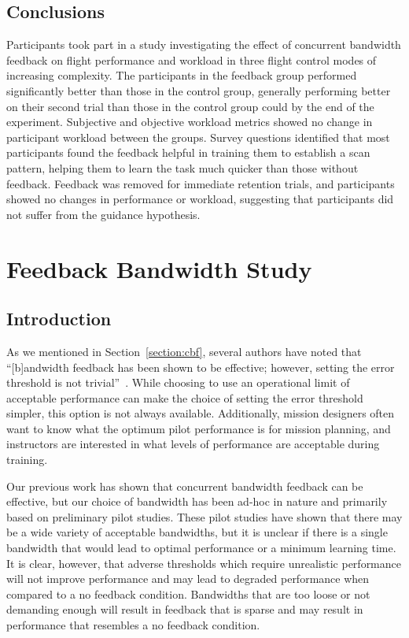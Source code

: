 \section{Conclusions}
Participants took part in a study investigating the effect of concurrent bandwidth feedback on flight performance and workload in three flight control modes of increasing complexity.
The participants in the feedback group performed significantly better than those in the control group, generally performing better on their second trial than those in the control group could by the end of the experiment.
Subjective and objective workload metrics showed no change in participant workload between the groups.
Survey questions identified that most participants found the feedback helpful in training them to establish a scan pattern, helping them to learn the task much quicker than those without feedback.
Feedback was removed for immediate retention trials, and participants showed no changes in performance or workload, suggesting that participants did not suffer from the guidance hypothesis.

\chapter{Feedback Bandwidth Study}
\label{chapter:bandwidthstudy}

\section{Introduction}

As we mentioned in Section~\ref{section:cbf}, several authors have noted that ``[b]andwidth feedback has been shown to be effective; however, setting the error threshold is not trivial''~\citep{sigrist_augmented_2013, timmermans_technology-assisted_2009, RIBEIRO2011231}.
While choosing to use an operational limit of acceptable performance can make the choice of setting the error threshold simpler, this option is not always available.
Additionally, mission designers often want to know what the optimum pilot performance is for mission planning, and instructors are interested in what levels of performance are acceptable during training.

Our previous work has shown that concurrent bandwidth feedback can be effective, but our choice of bandwidth has been ad-hoc in nature and primarily based on preliminary pilot studies.
These pilot studies have shown that there may be a wide variety of acceptable bandwidths, but it is unclear if there is a single bandwidth that would lead to optimal performance or a minimum learning time.
It is clear, however, that adverse thresholds which require unrealistic performance will not improve performance and may lead to degraded performance when compared to a no feedback condition.
Bandwidths that are too loose or not demanding enough will result in feedback that is sparse and may result in performance that resembles a no feedback condition.

